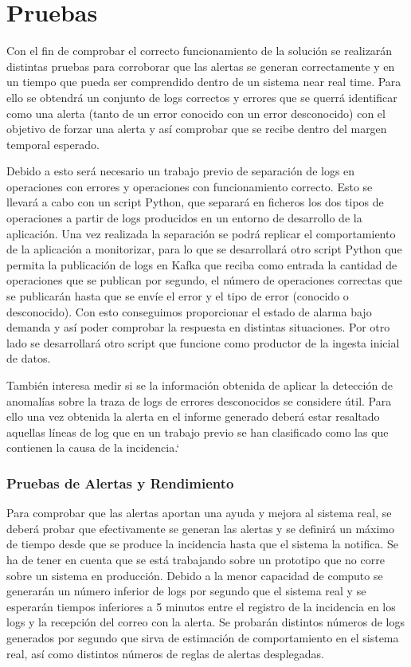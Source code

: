 \chapter{Pruebas}

Con el fin de comprobar el correcto funcionamiento de la solución se realizarán distintas pruebas para corroborar que las alertas se generan correctamente y en un tiempo que pueda ser comprendido dentro de un sistema near real time. Para ello se obtendrá un conjunto de logs correctos y errores que se querrá identificar como una alerta (tanto de un error conocido con un error desconocido) con el objetivo de forzar una alerta y así comprobar que se recibe dentro del margen temporal esperado.

Debido a esto será necesario un trabajo previo de separación de logs en operaciones con errores y operaciones con funcionamiento correcto. Esto se llevará a cabo con un script Python, que separará en ficheros los dos tipos de operaciones a partir de logs producidos en un entorno de desarrollo de la aplicación. Una vez realizada la separación se podrá replicar el comportamiento de la aplicación a monitorizar, para lo que se desarrollará otro script Python que permita la publicación de logs en Kafka que reciba como entrada la cantidad de operaciones que se publican por segundo, el número de operaciones correctas que se publicarán hasta que se envíe el error y el tipo de error (conocido o desconocido). Con esto conseguimos proporcionar el estado de alarma bajo demanda y así poder comprobar la respuesta en distintas situaciones. Por otro lado se desarrollará otro script que funcione como productor de la ingesta inicial de datos.

También interesa medir si se la información obtenida de aplicar la detección de anomalías sobre la traza de logs de errores desconocidos se considere útil. Para ello una vez obtenida la alerta en el informe generado deberá estar resaltado aquellas líneas de log que en un trabajo previo se han clasificado como las que contienen la causa de la incidencia.`

\subsection{Pruebas de Alertas y Rendimiento}

Para comprobar que las alertas aportan una ayuda y mejora al sistema real, se deberá probar que efectivamente se generan las alertas y se definirá un máximo de tiempo desde que se produce la incidencia hasta que el sistema la notifica. Se ha de tener en cuenta que se está trabajando sobre un prototipo que no corre sobre un sistema en producción. Debido a la menor capacidad de computo se generarán un número inferior de logs por segundo que el sistema real y se esperarán tiempos inferiores a 5 minutos entre el registro de la incidencia en los logs y la recepción del correo con la alerta. Se probarán distintos números de logs generados por segundo que sirva de estimación de comportamiento en el sistema real, así como distintos números de reglas de alertas desplegadas.

